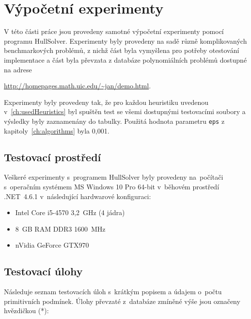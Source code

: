 


\chapter{Výpočetní experimenty}
V této části práce jsou provedeny samotné výpočetní experimenty pomocí programu HullSolver. Experimenty byly provedeny na sadě různě komplikovaných benchmarkových problémů, z nichž část byla vymyšlena pro potřeby otestování implementace a část byla převzata z databáze polynomiálních problémů dostupné na adrese {\url{http://homepages.math.uic.edu/~jan/demo.html}.

Experimenty byly provedeny tak, že pro každou heuristiku uvedenou v~\ref{ch:usedHeuristics} byl spuštěn test se všemi dostupnými testovacími soubory a výsledky byly zaznamenány do tabulky. Použitá hodnota parametru \verb|eps| z kapitoly~\ref{ch:algorithms} byla 0,001.


\section{Testovací prostředí}
Veškeré experimenty s~programem HullSolver byly provedeny na~počítači s~operačním systémem MS Windows 10 Pro 64-bit v~běhovém prostředí .NET~4.6.1 v~následující hardwarové konfiguraci:

\begin{itemize}
\item Intel Core i5-4570 3,2~GHz (4 jádra)
\item 8~GB RAM DDR3 1600~MHz
\item nVidia GeForce GTX970
\end{itemize}

\section{Testovací úlohy}

Následuje seznam testovacích úloh s~krátkým popisem a údajem o~počtu primitivních podmínek. Úlohy převzaté z~databáze zmíněné výše jsou označeny hvězdičkou (*):

}
